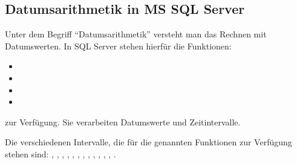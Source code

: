       \subsection{Datumsarithmetik in MS SQL Server}
        Unter dem Begriff \enquote{Datumsarithmetik} versteht man das Rechnen
        mit Datumswerten. In SQL Server stehen hierf\"ur die Funktionen:
        \begin{itemize}
          \item {}
          \item {}
          \item {}
          \item {}
        \end{itemize}
        zur Verf\"ugung. Sie verarbeiten Datumswerte und Zeitintervalle.
        \begin{merke}
          Die verschiedenen Intervalle, die f\"ur die genannten Funktionen zur
          Verf\"ugung stehen sind: ,
          ,  ,
          , , ,
          , , ,
          , , ,
          .
        \end{merke}

